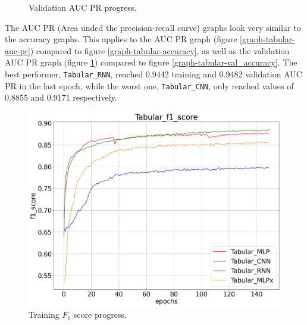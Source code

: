 \begin{figure}[!h]
\begin{minipage}{0.48\textwidth}
        \caption{Validation AUC PR progress.}
        \label{graph-tabular-val_auc-pr}
    \end{minipage}
\end{figure}
The AUC PR (Area unded the precision-recall curve) graphs look very similar to the accuracy graphs.
This applies to the AUC PR graph (figure \ref{graph-tabular-auc-pr}) compared to figure \ref{graph-tabular-accuracy},
as well as the validation AUC PR graph (figure \ref{graph-tabular-val_auc-pr}) compared to figure
\ref{graph-tabular-val_accuracy}.
The best performer, \texttt{Tabular\_RNN}, reached 0.9442 training and 0.9482 validation AUC PR in the last epoch,
while the worst one, \texttt{Tabular\_CNN}, only reached values of 0.8855 and 0.9171 respectively.
\pagebreak


\begin{figure}[!ht]
    \centering
    \begin{minipage}{0.48\textwidth}
        \centering
        \includegraphics[width=\linewidth]{obrazky-figures/Tabular_experiment/f1_score_2023-03-23_15:04:46.png}
        \caption{Training $F_1$ score progress.}
        \label{graph-tabular-f1}
    \end{minipage}\hfill
    \begin{minipage}{0.48\textwidth}
        \centering

\end{minipage}
\end{figure}
